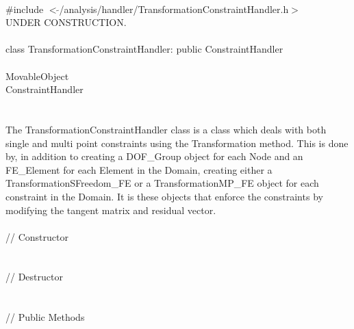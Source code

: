 
   \\
\indent \#include $<\tilde{
}$/analysis/handler/TransformationConstraintHandler.h$>$  \\ 

UNDER CONSTRUCTION.\\

  \\
\indent class TransformationConstraintHandler: public ConstraintHandler  \\

 \\
\indent MovableObject \\
\indent\indent ConstraintHandler \\
\indent\indent{} \\

 \\ 
\indent The TransformationConstraintHandler class is a class which deals with
both single and multi point constraints using the Transformation method. 
This is done by, in addition to creating a DOF\_Group object
for each Node and an FE\_Element for each Element in the Domain,
creating either a TransformationSFreedom\_FE or a TransformationMP\_FE object for each
constraint in the Domain. It is these objects that enforce the
constraints by modifying the tangent matrix and residual vector. \\ 


 \\
\indent // Constructor \\
\\  \\ 
\indent // Destructor \\
\\  \\
\indent // Public Methods\\
 \\ 
 \\ 
\\
\\
 \\
 \\


